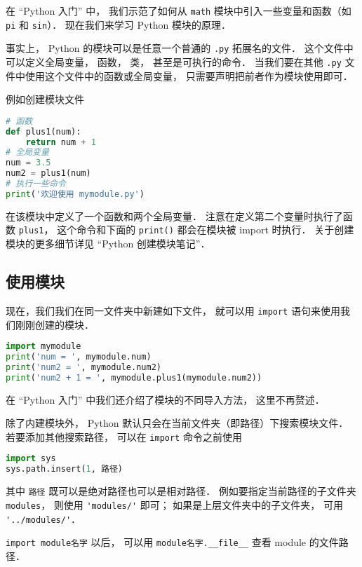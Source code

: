 

在 “Python 入门” 中， 我们示范了如何从 \verb|math| 模块中引入一些变量和函数（如 \verb|pi| 和 \verb|sin|）． 现在我们来学习 Python 模块的原理．

事实上， Python 的模块可以是任意一个普通的 \verb|.py| 拓展名的文件． 这个文件中可以定义全局变量， 函数， 类， 甚至是可执行的命令． 当我们要在其他 \verb|.py| 文件中使用这个文件中的函数或全局变量， 只需要声明把前者作为模块使用即可．

例如创建模块文件
\begin{lstlisting}[language=python,caption=mymodule.py]
# 函数
def plus1(num):
    return num + 1
# 全局变量
num = 3.5
num2 = plus1(num)
# 执行一些命令
print('欢迎使用 mymodule.py')
\end{lstlisting}
在该模块中定义了一个函数和两个全局变量． 注意在定义第二个变量时执行了函数 \verb|plus1|， 这个命令和下面的 \verb|print()| 都会在模块被 import 时执行． 关于创建模块的更多细节详见 “Python 创建模块笔记”．

\subsection{使用模块}
现在，我们我们在同一文件夹中新建如下文件， 就可以用 \verb|import| 语句来使用我们刚刚创建的模块．
\begin{lstlisting}[language=python,caption=test.py]
import mymodule
print('num = ', mymodule.num)
print('num2 = ', mymodule.num2)
print('num2 + 1 = ', mymodule.plus1(mymodule.num2))
\end{lstlisting}
在 “Python 入门” 中我们还介绍了模块的不同导入方法， 这里不再赘述．

除了内建模块外， Python 默认只会在当前文件夹（即路径）下搜索模块文件． 若要添加其他搜索路径， 可以在 \verb|import| 命令之前使用
\begin{lstlisting}[language=python]
import sys
sys.path.insert(1, 路径)
\end{lstlisting}
其中 \verb|路径| 既可以是绝对路径也可以是相对路径． %
例如要指定当前路径的子文件夹 \verb|modules|， 则使用 \verb|'modules/'| 即可； 如果是上层文件夹中的子文件夹， 可用 \verb|'../modules/'|．

\verb|import module名字| 以后， 可以用 \verb|module名字.__file__| 查看 module 的文件路径．

